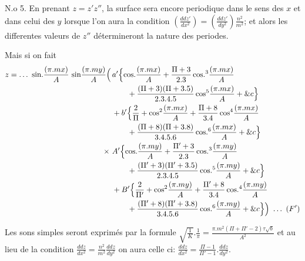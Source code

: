 \documentclass[11pt,a4paper]{article}
\begin{document}
N.o 5. En prenant $z = z'z''$, la surface sera encore periodique
dans le sens des $x$ et dans celui des $y$ lorsque l'on aura
la condition $\left(\frac{ddz'}{dx^2}\right) = \left(\frac{ddz'}{dy^2}\right)\frac{n^2}{m^2}$; et alors les differentes
valeurs de $z''$ détermineront la nature des periodes.

Mais si on fait
\begin{align*}
z = \ldots\ \text{sin.}\frac{(\pi.mx)}{A}\ \text{sin}\frac{(\pi.my)}{A}\Bigl(\,&a'\Bigl\{\text{cos.}\frac{(\pi.mx)}{A} + \frac{\Pi+3}{2.3}\,\text{cos.}^3\frac{(\pi.mx)}{A}\\
&\qquad + \frac{(\Pi+3)(\Pi+3.5)}{2.3.4.5}\,\text{cos}^5\frac{(\pi.mx)}{A} + \&c\Bigr\}\\
&+b'\Bigl\{\frac{2}{\Pi} + \text{cos}^2\frac{(\pi.mx)}{A} + \frac{\Pi+8}{3.4}\,\text{cos}^4\frac{(\pi.mx)}{A}\\
&\qquad + \frac{(\Pi+8)(\Pi+3.8)}{3.4.5.6}\,\text{cos.}^6\frac{(\pi.mx)}{A} + \&c\Bigr\}\\
\times\ &A'\Bigl\{\text{cos.}\frac{(\pi.my)}{A} + \frac{\Pi'+3}{2.3}\,\text{cos.}^3\frac{(\pi.my)}{A}\\
&\qquad + \frac{(\Pi'+3)(\Pi'+3.5)}{2.3.4.5}\,\text{cos.}^5\frac{(\pi.my)}{A} + \&c\Bigr\}\\
&+B'\Bigl\{\frac{2}{\Pi'} + \text{cos}^2\frac{(\pi.my)}{A} + \frac{\Pi'+8}{3.4}\,\text{cos.}^4\frac{(\pi.my)}{A}\\
&\qquad + \frac{(\Pi'+8)(\Pi'+3.8)}{3.4.5.6}\,\text{cos.}^6\frac{(\pi.my)}{A} + \&c\Bigr\}\Bigr)\ \ldots\ (F')
\end{align*}

Les sons simples seront exprimés par la formule $\sqrt{\tfrac{1}{K}}.\frac{1}{\pi} = \frac{\pi.m^2(\Pi+\Pi'-2)\tau\sqrt{b}}{A^2}$
et au lieu de la condition $\frac{ddz}{dx^2} = \frac{n^2}{m^2}\frac{ddz}{dy^2}$ on aura celle ci: $\frac{ddz}{dx^2} = \frac{\Pi-1}{\Pi'-1}.\frac{ddz}{dy^2}$.
\end{document}
